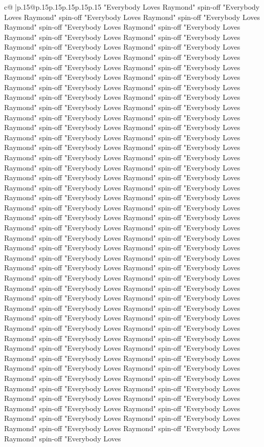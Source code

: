 \documentclass{article}
\begin{document}
{\begin{supertabular}{c@{$\;$}|p{.15\linewidth}@{}p{.15\linewidth}p{.15\linewidth}p{.15\linewidth}p{.15\linewidth}p{.15\linewidth}}
{{{"Everybody Loves Raymond" spin{-}off "Everybody Loves Raymond" spin{-}off "Everybody Loves Raymond" spin{-}off "Everybody Loves Raymond" spin{-}off "Everybody Loves Raymond" spin{-}off "Everybody Loves Raymond" spin{-}off "Everybody Loves Raymond" spin{-}off "Everybody Loves Raymond" spin{-}off "Everybody Loves Raymond" spin{-}off "Everybody Loves Raymond" spin{-}off "Everybody Loves Raymond" spin{-}off "Everybody Loves Raymond" spin{-}off "Everybody Loves Raymond" spin{-}off "Everybody Loves Raymond" spin{-}off "Everybody Loves Raymond" spin{-}off "Everybody Loves Raymond" spin{-}off "Everybody Loves Raymond" spin{-}off "Everybody Loves Raymond" spin{-}off "Everybody Loves Raymond" spin{-}off "Everybody Loves Raymond" spin{-}off "Everybody Loves Raymond" spin{-}off "Everybody Loves Raymond" spin{-}off "Everybody Loves Raymond" spin{-}off "Everybody Loves Raymond" spin{-}off "Everybody Loves Raymond" spin{-}off "Everybody Loves Raymond" spin{-}off "Everybody Loves Raymond" spin{-}off "Everybody Loves Raymond" spin{-}off "Everybody Loves Raymond" spin{-}off "Everybody Loves Raymond" spin{-}off "Everybody Loves Raymond" spin{-}off "Everybody Loves Raymond" spin{-}off "Everybody Loves Raymond" spin{-}off "Everybody Loves Raymond" spin{-}off "Everybody Loves Raymond" spin{-}off "Everybody Loves Raymond" spin{-}off "Everybody Loves Raymond" spin{-}off "Everybody Loves Raymond" spin{-}off "Everybody Loves Raymond" spin{-}off "Everybody Loves Raymond" spin{-}off "Everybody Loves Raymond" spin{-}off "Everybody Loves Raymond" spin{-}off "Everybody Loves Raymond" spin{-}off "Everybody Loves Raymond" spin{-}off "Everybody Loves Raymond" spin{-}off "Everybody Loves Raymond" spin{-}off "Everybody Loves Raymond" spin{-}off "Everybody Loves Raymond" spin{-}off "Everybody Loves Raymond" spin{-}off "Everybody Loves Raymond" spin{-}off "Everybody Loves Raymond" spin{-}off "Everybody Loves Raymond" spin{-}off "Everybody Loves Raymond" spin{-}off "Everybody Loves Raymond" spin{-}off "Everybody Loves Raymond" spin{-}off "Everybody Loves Raymond" spin{-}off "Everybody Loves Raymond" spin{-}off "Everybody Loves Raymond" spin{-}off "Everybody Loves Raymond" spin{-}off "Everybody Loves Raymond" spin{-}off "Everybody Loves Raymond" spin{-}off "Everybody Loves Raymond" spin{-}off "Everybody Loves Raymond" spin{-}off "Everybody Loves Raymond" spin{-}off "Everybody Loves Raymond" spin{-}off "Everybody Loves Raymond" spin{-}off "Everybody Loves Raymond" spin{-}off "Everybody Loves Raymond" spin{-}off "Everybody Loves Raymond" spin{-}off "Everybody Loves Raymond" spin{-}off "Everybody Loves Raymond" spin{-}off "Everybody Loves Raymond" spin{-}off "Everybody Loves Raymond" spin{-}off "Everybody Loves Raymond" spin{-}off "Everybody Loves Raymond" spin{-}off "Everybody Loves Raymond" spin{-}off "Everybody Loves Raymond" spin{-}off "Everybody Loves Raymond" spin{-}off "Everybody Loves Raymond" spin{-}off "Everybody Loves Raymond" spin{-}off "Everybody Loves Raymond" spin{-}off "Everybody Loves Raymond" spin{-}off "Everybody Loves Raymond" spin{-}off "Everybody Loves Raymond" spin{-}off "Everybody Loves Raymond" spin{-}off "Everybody Loves Raymond" spin{-}off "Everybody Loves }}}
\end{supertabular}}
\end{document}
